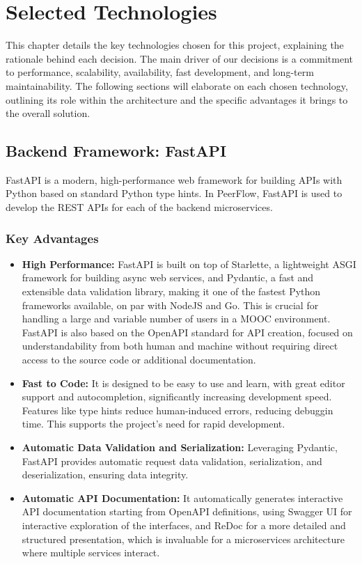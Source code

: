 \chapter{Selected Technologies}

\begin{justify}
This chapter details the key technologies chosen for this project, explaining the rationale behind each decision. The main driver of our decisions is a commitment to performance, scalability, availability, fast development, and long-term maintainability. The following sections will elaborate on each chosen technology, outlining its role within the architecture and the specific advantages it brings to the overall solution.
\end{justify}

\section{Backend Framework: FastAPI}

\begin{justify}
FastAPI is a modern, high-performance web framework for building APIs with Python based on standard Python type hints. In PeerFlow, FastAPI is used to develop the REST APIs for each of the backend microservices.
\end{justify}

\subsection{Key Advantages}

\begin{itemize}
\item \textbf{High Performance:} FastAPI is built on top of Starlette, a lightweight ASGI framework for building async web services, and Pydantic, a fast and extensible data validation library, making it one of the fastest Python frameworks available, on par with NodeJS and Go. This is crucial for handling a large and variable number of users in a MOOC environment. FastAPI is also based on the OpenAPI standard for API creation, focused on understandability from both human and machine without requiring direct access to the source code or additional documentation.
\item \textbf{Fast to Code:} It is designed to be easy to use and learn, with great editor support and autocompletion, significantly increasing development speed. Features like type hints reduce human-induced errors, reducing debuggin time. This supports the project's need for rapid development.
\item \textbf{Automatic Data Validation and Serialization:} Leveraging Pydantic, FastAPI provides automatic request data validation, serialization, and deserialization, ensuring data integrity.
\item \textbf{Automatic API Documentation:} It automatically generates interactive API documentation starting from OpenAPI definitions, using Swagger UI for interactive exploration of the interfaces, and ReDoc for a more detailed and structured presentation, which is invaluable for a microservices architecture where multiple services interact.
\end{itemize}

